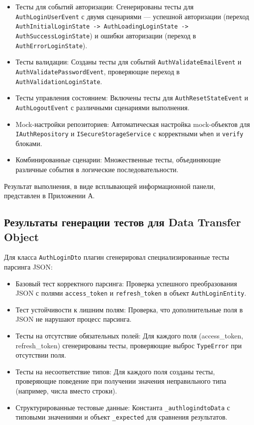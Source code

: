 \documentclass[14pt, russian]{scrartcl}
\begin{document}
\begin{itemize}
    \item Тесты для событий авторизации: Сгенерированы тесты для \texttt{AuthLoginUserEvent} с двумя сценариями — успешной авторизации (переход \texttt{AuthInitialLoginState -> AuthLoadingLoginState -> AuthSuccessLoginState}) и ошибки авторизации (переход в \texttt{AuthErrorLoginState}).
    \item Тесты валидации: Созданы тесты для событий \texttt{AuthValidateEmailEvent} и \texttt{AuthValidatePasswordEvent}, проверяющие переход в \texttt{AuthValidationLoginState}.
    \item Тесты управления состоянием: Включены тесты для \texttt{AuthResetStateEvent} и \texttt{AuthLogoutEvent} с различными сценариями выполнения.
    \item Mock-настройки репозиториев: Автоматическая настройка mock-объектов для \texttt{IAuthRepository} и \texttt{ISecureStorageService} с корректными \texttt{when} и \texttt{verify} блоками.
    \item Комбинированные сценарии: Множественные тесты, объединяющие различные события в логические последовательности.
\end{itemize}

Результат выполнения, в виде всплывающей информационной панели, представлен в Приложении А.

\subsection{Результаты генерации тестов для Data Transfer Object}

Для класса \texttt{AuthLoginDto} плагин сгенерировал специализированные тесты парсинга JSON:

\begin{itemize}
    \item Базовый тест корректного парсинга: Проверка успешного преобразования JSON с полями \texttt{access\_token} и \texttt{refresh\_token} в объект \texttt{AuthLoginEntity}.
    \item Тест устойчивости к лишним полям: Проверка, что дополнительные поля в JSON не нарушают процесс парсинга.
    \item Тесты на отсутствие обязательных полей: Для каждого поля (access\_token, refresh\_token) сгенерированы тесты, проверяющие выброс \texttt{TypeError} при отсутствии поля.
    \item Тесты на несоответствие типов: Для каждого поля созданы тесты, проверяющие поведение при получении значения неправильного типа (например, числа вместо строки).
    \item Структурированные тестовые данные: Константа \texttt{\_authlogindtoData} с типовыми значениями и объект \texttt{\_expected} для сравнения результатов.
\end{itemize}
\end{document}
